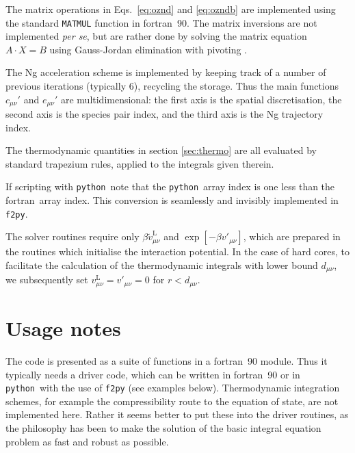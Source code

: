 \documentclass[12pt,a4paper]{article}
\newcommand{\latin}[1]{\emph{#1}}
\newcommand{\perse}{\latin{per se}}
\newcommand{\lr}{^{\mathrm{L}}}
\newcommand{\Eqsref}[1]{Eqs.~\eqref{#1}}
\newcommand{\FORTRAN}{{\sc fortran}}
\newcommand{\python}{{\tt python}}
\begin{document}
The matrix operations in \Eqsref{eq:oznd} and \eqref{eq:ozndb} are
implemented using the standard \verb+MATMUL+ function in \FORTRAN\ 90.
The matrix inversions are not implemented \perse, but are rather done
by solving the matrix equation $A\cdot X=B$ using Gauss-Jordan
elimination with pivoting \cite{NR92}.

The Ng acceleration scheme is implemented by keeping track of a number
of previous iterations (typically 6), recycling the storage.  Thus the
main functions $c_{\mu\nu}'$ and $e_{\mu\nu}'$ are multidimensional:
the first axis is the spatial discretisation, the second axis is the
species pair index, and the third axis is the Ng trajectory index.

The thermodynamic quantities in section \ref{sec:thermo} are all
evaluated by standard trapezium rules, applied to the integrals given
therein.

If scripting with \python\ note that the \python\ array index is one
less than the \FORTRAN\ array index.  This conversion is seamlessly
and invisibly implemented in \verb+f2py+.

The solver routines require only $\beta\tilde v_{\mu\nu}\lr$ and
$\exp[-\beta v'_{\mu\nu}]$, which are prepared in the routines which
initialise the interaction potential.  In the case of hard cores, to
facilitate the calculation of the thermodynamic integrals with lower
bound $d_{\mu\nu}$, we subsequently set $v_{\mu\nu}\lr=v'_{\mu\nu}=0$
for $r<d_{\mu\nu}$.

\section{Usage notes}
%
The code is presented as a suite of functions in a \FORTRAN\ 90
module.  Thus it typically needs a driver code, which can be written
in \FORTRAN\ 90 or in \python\ with the use of \verb+f2py+ (see
examples below).  Thermodynamic integration schemes, for example the
compressibility route to the equation of state, are not implemented
here.  Rather it seems better to put these into the driver routines,
as the philosophy has been to make the solution of the basic integral
equation problem as fast and robust as possible.
\end{document}
